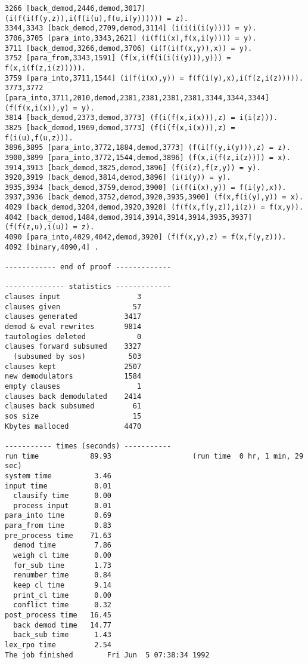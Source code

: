 {\begin{verbatim}
3266 [back_demod,2446,demod,3017] (i(f(i(f(y,z)),i(f(i(u),f(u,i(y)))))) = z).
3344,3343 [back_demod,2709,demod,3114] (i(i(i(i(y)))) = y).
3706,3705 [para_into,3343,2621] (i(f(i(x),f(x,i(y)))) = y).
3711 [back_demod,3266,demod,3706] (i(f(i(f(x,y)),x)) = y).
3752 [para_from,3343,1591] (f(x,i(f(i(i(i(y))),y))) = f(x,i(f(z,i(z))))).
3759 [para_into,3711,1544] (i(f(i(x),y)) = f(f(i(y),x),i(f(z,i(z))))).
3773,3772 [para_into,3711,2010,demod,2381,2381,2381,2381,3344,3344,3344] (f(f(x,i(x)),y) = y).
3814 [back_demod,2373,demod,3773] (f(i(f(x,i(x))),z) = i(i(z))).
3825 [back_demod,1969,demod,3773] (f(i(f(x,i(x))),z) = f(i(u),f(u,z))).
3896,3895 [para_into,3772,1884,demod,3773] (f(i(f(y,i(y))),z) = z).
3900,3899 [para_into,3772,1544,demod,3896] (f(x,i(f(z,i(z)))) = x).
3914,3913 [back_demod,3825,demod,3896] (f(i(z),f(z,y)) = y).
3920,3919 [back_demod,3814,demod,3896] (i(i(y)) = y).
3935,3934 [back_demod,3759,demod,3900] (i(f(i(x),y)) = f(i(y),x)).
3937,3936 [back_demod,3752,demod,3920,3935,3900] (f(x,f(i(y),y)) = x).
4029 [back_demod,3204,demod,3920,3920] (f(f(x,f(y,z)),i(z)) = f(x,y)).
4042 [back_demod,1484,demod,3914,3914,3914,3914,3935,3937] (f(f(z,u),i(u)) = z).
4090 [para_into,4029,4042,demod,3920] (f(f(x,y),z) = f(x,f(y,z))).
4092 [binary,4090,4] .

------------ end of proof -------------

-------------- statistics -------------
clauses input                  3
clauses given                 57
clauses generated           3417
demod & eval rewrites       9814
tautologies deleted            0
clauses forward subsumed    3327
  (subsumed by sos)          503
clauses kept                2507
new demodulators            1584
empty clauses                  1
clauses back demodulated    2414
clauses back subsumed         61
sos size                      15
Kbytes malloced             4470

----------- times (seconds) -----------
run time            89.93                   (run time  0 hr, 1 min, 29 sec)
system time          3.46
input time           0.01
  clausify time      0.00
  process input      0.01
para_into time       0.69
para_from time       0.83
pre_process time    71.63
  demod time         7.86
  weigh cl time      0.00
  for_sub time       1.73
  renumber time      0.84
  keep cl time       9.14
  print_cl time      0.00
  conflict time      0.32
post_process time   16.45
  back demod time   14.77
  back_sub time      1.43
lex_rpo time         2.54
The job finished        Fri Jun  5 07:38:34 1992
\end{verbatim} }
